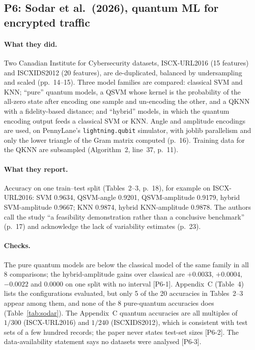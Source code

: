 \documentclass[11pt,a4paper]{article}
\newcommand{\code}[1]{\texttt{\small #1}}
\newcommand{\chk}[1]{\textsf{\small [#1]}}
\begin{document}
\subsection{P6: Sodar et al.\ (2026), quantum ML for encrypted traffic}
\label{sec:p6}
\paragraph{What they did.} Two Canadian Institute for Cybersecurity datasets, ISCX-URL2016 (15 features) and ISCXIDS2012 (20 features), are de-duplicated, balanced by undersampling and scaled (pp.~14--15). Three model families are compared: classical SVM and KNN; ``pure'' quantum models, a QSVM whose kernel is the probability of the all-zero state after encoding one sample and un-encoding the other, and a QKNN with a fidelity-based distance; and ``hybrid'' models, in which the quantum encoding output feeds a classical SVM or KNN. Angle and amplitude encodings are used, on PennyLane's \code{lightning.qubit} simulator, with joblib parallelism and only the lower triangle of the Gram matrix computed (p.~16). Training data for the QKNN are subsampled (Algorithm~2, line~37, p.~11).

\paragraph{What they report.} Accuracy on one train--test split (Tables~2--3, p.~18), for example on ISCX-URL2016: SVM 0.9634, QSVM-angle 0.9201, QSVM-amplitude 0.9179, hybrid SVM-amplitude 0.9667; KNN 0.9874, hybrid KNN-amplitude 0.9878. The authors call the study ``a feasibility demonstration rather than a conclusive benchmark'' (p.~17) and acknowledge the lack of variability estimates (p.~23).

\paragraph{Checks.} The pure quantum models are below the classical model of the same family in all 8 comparisons; the hybrid-amplitude gains over classical are $+0.0033$, $+0.0004$, $-0.0022$ and $0.0000$ on one split with no interval \chk{P6-1}. Appendix~C (Table~4) lists the configurations evaluated, but only 5 of the 20 accuracies in Tables~2--3 appear among them, and none of the 8 pure-quantum accuracies does (Table~\ref{tab:sodar}). The Appendix~C quantum accuracies are all multiples of $1/300$ (ISCX-URL2016) and $1/240$ (ISCXIDS2012), which is consistent with test sets of a few hundred records; the paper never states test-set sizes \chk{P6-2}. The data-availability statement says no datasets were analysed \chk{P6-3}.
\end{document}
